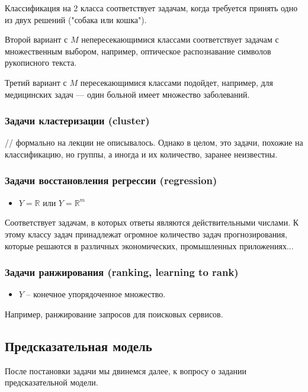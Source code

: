 \documentclass{article}
\begin{document}
Классификация на 2 класса соответствует задачам, когда требуется принять одно из двух решений ("собака или кошка").

Второй вариант с $M$ непересекающимися классами соответствует задачам с множественным выбором, например, оптическое распознавание символов рукописного текста.

Третий вариант с $M$ пересекающимися классами подойдет, например, для медицинских задач --- один больной имеет множество заболеваний.


\subsubsection{Задачи кластеризации (cluster)}

// формально на лекции не описывалось. Однако в целом, это задачи, похожие на классификацию, но группы, а иногда и их количество, заранее неизвестны.

\subsubsection{Задачи восстановления регрессии (regression)}

\begin{itemize}
\item $Y = \mathbb{R}$ или $Y = \mathbb{R}^m$
\end{itemize}

Соответствует задачам, в которых ответы являются действительными числами. К этому классу задач принадлежат огромное количество задач прогнозирования, которые решаются в различных экономических, промышленных приложениях...

\subsubsection{Задачи ранжирования (ranking, learning to rank)}

\begin{itemize}
\item $Y$ -- конечное упорядоченное множество.
\end{itemize}

Например, ранжирование запросов для поисковых сервисов.

\subsection{Предсказательная модель}

После постановки задачи мы двинемся далее, к вопросу о задании предсказательной модели. 
\\
\end{document}
